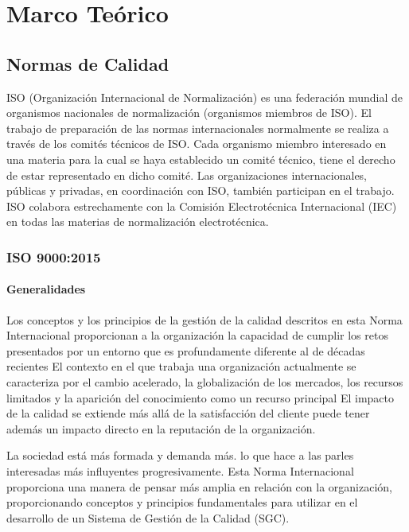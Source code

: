 \thispagestyle{plain}
\chapter{Marco Teórico}
	\section{Normas de Calidad}
		\par 
			ISO (Organización Internacional de Normalización) es una federación mundial de organismos
			nacionales de normalización (organismos miembros de ISO). El trabajo de preparación de las normas
			internacionales normalmente se realiza a través de los comités técnicos de ISO. Cada organismo
			miembro interesado en una materia para la cual se haya establecido un comité técnico, tiene el derecho
			de estar representado en dicho comité. Las organizaciones internacionales, públicas y privadas, en
			coordinación con ISO, también participan en el trabajo. ISO colabora estrechamente con la Comisión
			Electrotécnica Internacional (IEC) en todas las materias de normalización electrotécnica.
		\subsection{ISO 9000:2015}
			\subsubsection{Generalidades}
				\par
					Los conceptos y los principios de la gestión de la calidad descritos en esta Norma Internacional
					proporcionan a la organización la capacidad de cumplir los retos presentados por un entorno que es
					profundamente diferente al de décadas recientes El contexto en el que trabaja una organización
					actualmente se caracteriza por el cambio acelerado, la globalización de los mercados, los recursos
					limitados y la aparición del conocimiento como un recurso principal El impacto de la calidad se extiende
					más allá de la satisfacción del cliente puede tener además un impacto directo en la reputación de la
					organización.
					
				\newpage
				\thispagestyle{plain}
				
				\par 
					\noindent La sociedad está más formada y demanda más. lo que hace a las parles interesadas más influyentes
					progresivamente. Esta Norma Internacional proporciona una manera de pensar más amplia en relación
					con la organización, proporcionando conceptos y principios fundamentales para utilizar en el desarrollo
					de un Sistema de Gestión de la Calidad (SGC).
					
